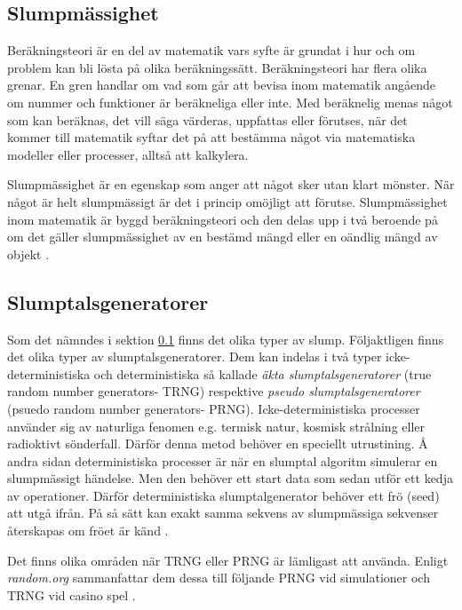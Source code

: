 \documentclass[swedish,a4paper]{article}
\begin{document}
\subsection{Slumpmässighet}
\label{sec:slump}
Beräkningsteori är en del av matematik vars syfte är grundat i hur och om
problem kan bli lösta på olika beräkningssätt. Beräkningsteori har flera olika
grenar. En gren handlar om vad som går att bevisa inom matematik angående om
nummer och funktioner är beräkneliga eller inte. Med beräknelig menas något som
kan beräknas, det vill säga värderas, uppfattas eller förutses, när det kommer
till matematik syftar det på att bestämma något via matematiska
modeller eller processer, alltså att kalkylera.

Slumpmässighet är en egenskap som anger att något sker utan klart mönster. När
något är helt slumpmässigt är det i princip omöjligt att förutse. Slumpmässighet
inom matematik är byggd beräknings\-teori och den delas upp i två beroende på om
det gäller slumpmässighet av en bestämd mängd eller en oändlig mängd av objekt
\parencite[49-66]{Terwijn2016}.

\subsection{Slumptalsgeneratorer}
\label{sec:prng}

Som det nämndes i sektion \ref{sec:slump}  finns det olika typer av slump.
Följaktligen finns det olika typer av slumptalsgeneratorer. Dem kan indelas i två
typer icke-deterministiska och deterministiska så kallade \textit{äkta
slumptalsgeneratorer} (true random number generators- TRNG) respektive 
\textit{pseudo slumptalsgeneratorer} (psuedo random number
generators- PRNG). Icke-deterministiska processer använder sig av naturliga
fenomen e.g. termisk natur, kosmisk strålning eller radioktivt sönderfall.
Därför denna metod behöver en speciellt utrustining. Å andra sidan
deterministiska processer är när en slumptal algoritm simulerar en slumpmässigt
händelse. Men den behöver ett start data som sedan utför ett kedja av
operationer. Därför deterministiska slumptalgenerator behöver ett frö (seed) att
utgå ifrån. På så sätt kan exakt samma sekvens av slumpmässiga sekvenser
återskapas om fröet
är känd \parencite{salinhanes2011}.

Det finns olika områden när TRNG eller PRNG är lämligast att använda.
Enligt \textit{random.org} sammanfattar dem dessa till följande PRNG vid simulationer och
TRNG vid casino spel \parencite{randomorg}. 
\end{document}
